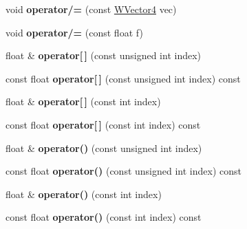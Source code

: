\begin{DoxyCompactItemize}
\item 
void {\bfseries operator/=} (const \hyperlink{class_w_vector4}{W\+Vector4} vec)\hypertarget{class_w_vector4_acfd98c93b5dc41e9fa5cb231a53369b9}{}\label{class_w_vector4_acfd98c93b5dc41e9fa5cb231a53369b9}

\item 
void {\bfseries operator/=} (const float f)\hypertarget{class_w_vector4_a3510023cb573cead4f7a3e078d99b2b8}{}\label{class_w_vector4_a3510023cb573cead4f7a3e078d99b2b8}

\item 
float \& {\bfseries operator\mbox{[}$\,$\mbox{]}} (const unsigned int index)\hypertarget{class_w_vector4_a0d85274e063ede74f1ec3a9f5b0fac16}{}\label{class_w_vector4_a0d85274e063ede74f1ec3a9f5b0fac16}

\item 
const float {\bfseries operator\mbox{[}$\,$\mbox{]}} (const unsigned int index) const \hypertarget{class_w_vector4_aac63efd189da2db75774ccc460aed1fc}{}\label{class_w_vector4_aac63efd189da2db75774ccc460aed1fc}

\item 
float \& {\bfseries operator\mbox{[}$\,$\mbox{]}} (const int index)\hypertarget{class_w_vector4_afd1a72d67609fbef983bd79d2fc72297}{}\label{class_w_vector4_afd1a72d67609fbef983bd79d2fc72297}

\item 
const float {\bfseries operator\mbox{[}$\,$\mbox{]}} (const int index) const \hypertarget{class_w_vector4_abd0e33cc678c4944fe1c6d892203d71f}{}\label{class_w_vector4_abd0e33cc678c4944fe1c6d892203d71f}

\item 
float \& {\bfseries operator()} (const unsigned int index)\hypertarget{class_w_vector4_a0a30f0b11f602f78caeca80cbbb07be7}{}\label{class_w_vector4_a0a30f0b11f602f78caeca80cbbb07be7}

\item 
const float {\bfseries operator()} (const unsigned int index) const \hypertarget{class_w_vector4_a1d0397287c3f9e96df51aed658f95d0b}{}\label{class_w_vector4_a1d0397287c3f9e96df51aed658f95d0b}

\item 
float \& {\bfseries operator()} (const int index)\hypertarget{class_w_vector4_a2fec5b3c07443b6d34c828dc5b216c44}{}\label{class_w_vector4_a2fec5b3c07443b6d34c828dc5b216c44}

\item 
const float {\bfseries operator()} (const int index) const \hypertarget{class_w_vector4_a249f16425303a93d3c855545afdbb219}{}\label{class_w_vector4_a249f16425303a93d3c855545afdbb219}


\end{DoxyCompactItemize}
